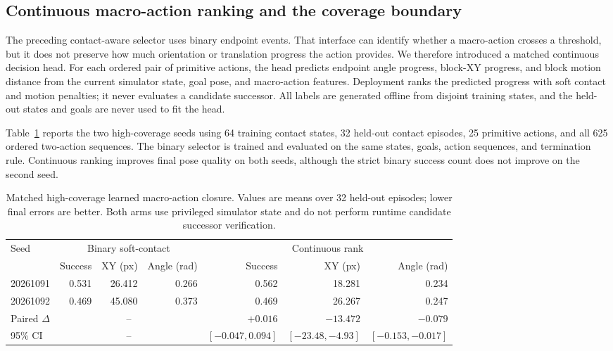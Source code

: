\documentclass{article}
\begin{document}
\subsection{Continuous macro-action ranking and the coverage boundary}
\label{sec:supp-continuous-macro-ranking}

The preceding contact-aware selector uses binary endpoint events. That
interface can identify whether a macro-action crosses a threshold, but it
does not preserve how much orientation or translation progress the action
provides. We therefore introduced a matched continuous decision head. For
each ordered pair of primitive actions, the head predicts endpoint angle
progress, block-XY progress, and block motion distance from the current
simulator state, goal pose, and macro-action features. Deployment ranks the
predicted progress with soft contact and motion penalties; it never evaluates
a candidate successor. All labels are generated offline from disjoint
training states, and the held-out states and goals are never used to fit the
head.

Table~\ref{tab:supp-continuous-closure} reports the two high-coverage seeds
using 64 training contact states, 32 held-out contact episodes, 25 primitive
actions, and all 625 ordered two-action sequences. The binary selector is
trained and evaluated on the same states, goals, action sequences, and
termination rule. Continuous ranking improves final pose quality on both
seeds, although the strict binary success count does not improve on the
second seed.

\begin{table}[H]
\centering
\scriptsize
\setlength{\tabcolsep}{5pt}
\caption{Matched high-coverage learned macro-action closure. Values are
means over 32 held-out episodes; lower final errors are better. Both arms
use privileged simulator state and do not perform runtime candidate
successor verification.}
\label{tab:supp-continuous-closure}
\begin{tabular}{lrrrrrr}
\toprule
Seed & \multicolumn{3}{c}{Binary soft-contact} & \multicolumn{3}{c}{Continuous rank}\\
 & Success & XY (px) & Angle (rad) & Success & XY (px) & Angle (rad)\\
\midrule
20261091 & 0.531 & 26.412 & 0.266 & 0.562 & 18.281 & 0.234\\
20261092 & 0.469 & 45.080 & 0.373 & 0.469 & 26.267 & 0.247\\
\midrule
Paired $\Delta$ & \multicolumn{3}{c}{--} & $+0.016$ & $-13.472$ & $-0.079$\\
95\% CI & \multicolumn{3}{c}{--} & $[-0.047,0.094]$ & $[-23.48,-4.93]$ & $[-0.153,-0.017]$\\
\bottomrule
\end{tabular}
\end{table}
\end{document}
